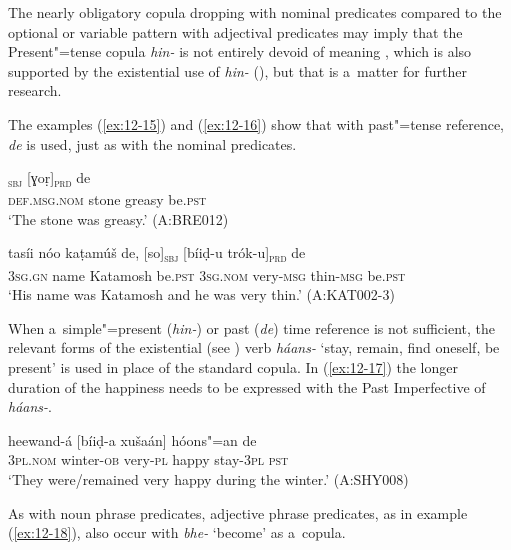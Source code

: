 The nearly obligatory copula dropping with nominal predicates compared to the optional or variable pattern with adjectival predicates may imply that the Present"=tense copula \textit{hin-} is not entirely devoid of meaning \citep[8, 31, 66]{pustet2003}, which is also supported by the existential use of \textit{hin-} (), but that is a~matter for further research.



The examples (\ref{ex:12-15}) and (\ref{ex:12-16}) show that with past"=tense reference, \textit{de} is used, just as with the nominal predicates.

\begin{exe}
\ex
\label{ex:12-15}
\gll [so báaṭ]\textsubscript{\textsc{sbj}} [ɣoṛ]\textsubscript{\textsc{prd}} de \\
\textsc{def.msg.nom} stone greasy be.\textsc{pst} \\
\glt `The stone was greasy.' (A:BRE012)
\end{exe}
\begin{exe}
\ex
\label{ex:12-16}
\gll tasíi nóo kaṭamúš de, [so]\textsubscript{\textsc{sbj}} [bíiḍ-u trók-u]\textsubscript{\textsc{prd}} de \\
\textsc{3sg.gn} name Katamosh be.\textsc{pst} \textsc{3sg.nom} very-\textsc{msg}  thin-\textsc{msg} be.\textsc{pst} \\
\glt `His name was Katamosh and he was very thin.' (A:KAT002-3)
\end{exe}

When a~simple"=present (\textit{hin-}) or past (\textit{de}) time reference is not sufficient, the relevant forms of the existential (see ) verb \textit{háans-} `stay, remain, find oneself, be present' is used in place of the standard copula. In (\ref{ex:12-17}) the longer duration of the happiness needs to be expressed with the Past Imperfective of \textit{háans-}.

\begin{exe}
\ex
\label{ex:12-17}
\gll [se] heewand-á [bíiḍ-a xušaán] hóons"=an de \\
\textsc{3pl.nom} winter-\textsc{ob} very-\textsc{pl} happy stay-\textsc{3pl} \textsc{pst} \\
\glt `They were/remained very happy during the winter.' (A:SHY008)
\end{exe}

As with noun phrase predicates, adjective phrase predicates, as in example (\ref{ex:12-18}), also occur with \textit{bhe-} `become' as a~copula.

